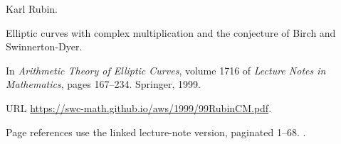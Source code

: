 Karl Rubin.

\newblock Elliptic curves with complex multiplication and the conjecture of
  {B}irch and {S}winnerton-{D}yer.

\newblock In \emph{Arithmetic Theory of Elliptic Curves}, volume 1716 of
  \emph{Lecture Notes in Mathematics}, pages 167--234. Springer, 1999.

\newblock URL \url{https://swc-math.github.io/aws/1999/99RubinCM.pdf}.

\newblock Page references use the linked lecture-note version, paginated 1--68.
\newblock {}.
